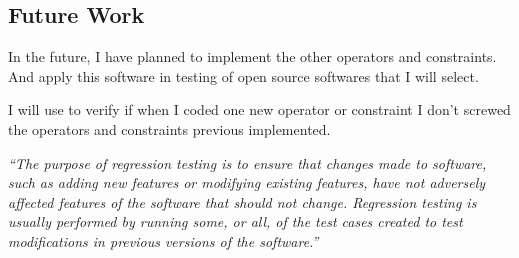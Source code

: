 \clearpage
\subsection{Future Work}

In the future, I have planned to implement the other operators and constraints. And apply this software in testing of open source softwares that I will select.

I will use  to verify if when I coded one new operator or constraint I don't screwed the operators and constraints previous implemented.


\textit{``The purpose of regression testing is to ensure that changes made to software, such as adding new features or modifying existing features, have not adversely affected features of the software that should not change. Regression testing is usually performed by running some, or all, of the test cases created to test modifications in previous versions of the software.''}



